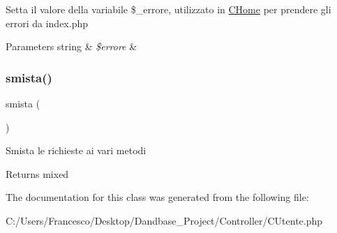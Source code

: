 Setta il valore della variabile \$\+\_\+errore, utilizzato in \mbox{\hyperlink{class_c_home}{C\+Home}} per prendere gli errori da index.\+php


\begin{DoxyParams}[1]{Parameters}
string & {\em \$errore} & \\
\hline
\end{DoxyParams}
\mbox{\label{class_c_utente_afc7ba180569cef3535974cfc4a1211f1}} 
\subsubsection{\texorpdfstring{smista()}{smista()}}
{\footnotesize\ttfamily smista (\begin{DoxyParamCaption}{ }\end{DoxyParamCaption})}

Smista le richieste ai vari metodi

\begin{DoxyReturn}{Returns}
mixed 
\end{DoxyReturn}


The documentation for this class was generated from the following file\+:\begin{DoxyCompactItemize}
\item 
C\+:/\+Users/\+Francesco/\+Desktop/\+Dandbase\+\_\+\+Project/\+Controller/C\+Utente.\+php\end{DoxyCompactItemize}
